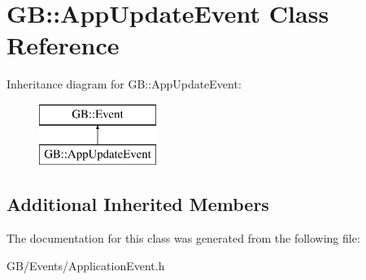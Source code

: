 \hypertarget{class_g_b_1_1_app_update_event}{}\section{GB\+::App\+Update\+Event Class Reference}
\label{class_g_b_1_1_app_update_event}
Inheritance diagram for GB\+::App\+Update\+Event\+:\begin{figure}[H]
\begin{center}
\leavevmode
\includegraphics[height=2.000000cm]{class_g_b_1_1_app_update_event}
\end{center}
\end{figure}
\subsection*{Additional Inherited Members}


The documentation for this class was generated from the following file\+:\begin{DoxyCompactItemize}
\item 
G\+B/\+Events/Application\+Event.\+h\end{DoxyCompactItemize}
